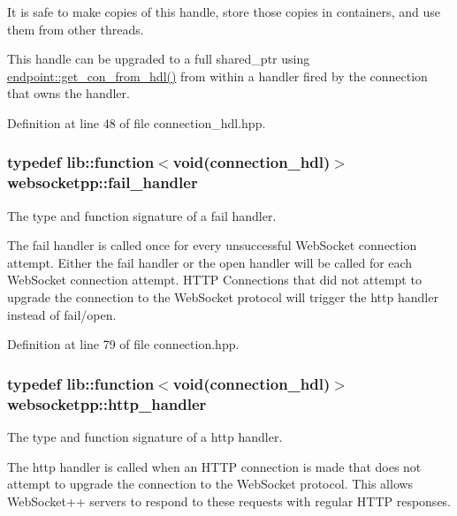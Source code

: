 It is safe to make copies of this handle, store those copies in containers, and use them from other threads.

This handle can be upgraded to a full shared\+\_\+ptr using {\ttfamily \hyperlink{classwebsocketpp_1_1endpoint_a0fe4457427d4124abe7ca022ba7afbb4}{endpoint\+::get\+\_\+con\+\_\+from\+\_\+hdl()}} from within a handler fired by the connection that owns the handler. 

Definition at line 48 of file connection\+\_\+hdl.\+hpp.

\subsubsection[{\texorpdfstring{fail\+\_\+handler}{fail\_handler}}]{\setlength{\rightskip}{0pt plus 5cm}typedef lib\+::function$<$void({\bf connection\+\_\+hdl})$>$ {\bf websocketpp\+::fail\+\_\+handler}}\hypertarget{namespacewebsocketpp_a5bb2e61cfe649b2e012f1a2c5693a4d5}{}\label{namespacewebsocketpp_a5bb2e61cfe649b2e012f1a2c5693a4d5}


The type and function signature of a fail handler. 

The fail handler is called once for every unsuccessful Web\+Socket connection attempt. Either the fail handler or the open handler will be called for each Web\+Socket connection attempt. H\+T\+TP Connections that did not attempt to upgrade the connection to the Web\+Socket protocol will trigger the http handler instead of fail/open. 

Definition at line 79 of file connection.\+hpp.

\subsubsection[{\texorpdfstring{http\+\_\+handler}{http\_handler}}]{\setlength{\rightskip}{0pt plus 5cm}typedef lib\+::function$<$void({\bf connection\+\_\+hdl})$>$ {\bf websocketpp\+::http\+\_\+handler}}\hypertarget{namespacewebsocketpp_a37bc4d5b3b21d3bb494d8a23236315d2}{}\label{namespacewebsocketpp_a37bc4d5b3b21d3bb494d8a23236315d2}


The type and function signature of a http handler. 

The http handler is called when an H\+T\+TP connection is made that does not attempt to upgrade the connection to the Web\+Socket protocol. This allows Web\+Socket++ servers to respond to these requests with regular H\+T\+TP responses.


